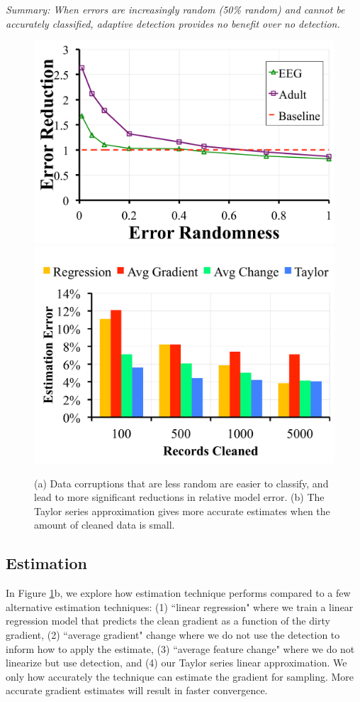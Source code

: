 \vspace{0.25em}

\noindent \emph{Summary: When errors are increasingly random (50\% random) and cannot be accurately classified, adaptive detection provides no benefit over no detection. }

\begin{figure}[ht!]
\vspace{-1em}
\centering
 \includegraphics[width=0.49\columnwidth]{exp/exp5a.pdf}
 \includegraphics[width=0.49\columnwidth]{exp/exp12.pdf}
 \caption{(a) Data corruptions that are less random are easier to classify, and lead to more significant reductions in relative model error. (b) The Taylor series approximation gives more accurate estimates when the amount of cleaned data is small. \label{tradeoffs2}}
\end{figure}

\subsection{Estimation}\label{est}
In Figure \ref{tradeoffs2}b, we explore how estimation technique performs compared to a few alternative estimation techniques: (1) ``linear regression" where we train a linear regression model that predicts the clean gradient as a function of the dirty gradient, (2) ``average gradient" change where we do not use the detection to inform how to apply the estimate, (3) ``average feature change" where we do not linearize but use detection, and (4) our Taylor series linear approximation.
We only how accurately the technique can estimate the gradient for sampling.
More accurate gradient estimates will result in faster convergence.

